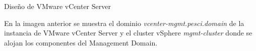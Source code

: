 \begin{subsubsection}{Diseño de VMware vCenter Server}
\begin{figure}[h]
\end{figure}
\FloatBarrier
En la imagen anterior se muestra el dominio \textit{vcenter-mgmt.pesci.domain} de la instancia de VMware vCenter Server y el cluster vSphere \textit{mgmt-cluster} donde se alojan los componentes del Management Domain. 

\end{subsubsection}

